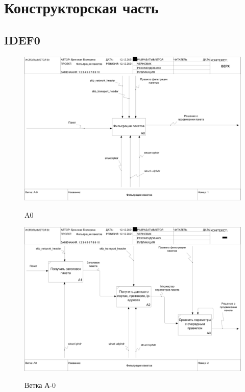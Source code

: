 \section{Конструкторская часть}

\subsection{IDEF0}
\begin{figure}[h]
	\begin{center}
		{\includegraphics[scale = 0.3]{img/idef0/main.png}}
		\caption{A0}
		\label{fig29:image}
	\end{center}
\end{figure}

\newpage

\begin{figure}[h]
	\begin{center}
		{\includegraphics[scale = 0.3]{img/idef0/down.png}}
		\caption{Ветка А-0}
		\label{fig200:image}
	\end{center}
\end{figure}

